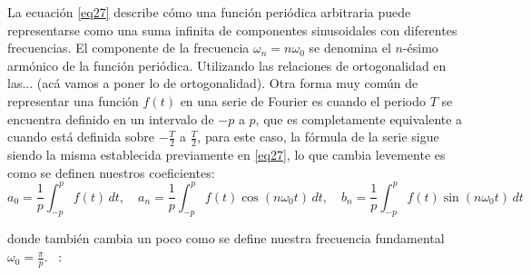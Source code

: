 La ecuación \eqref{eq27} describe cómo una función periódica arbitraria puede representarse como una suma infinita de componentes sinusoidales con diferentes frecuencias. El componente de la frecuencia $\omega_n = n\omega_0$ se denomina el $n$-ésimo armónico de la función periódica. Utilizando las relaciones de ortogonalidad en las... (acá vamos a poner lo de ortogonalidad).\newline
Otra forma muy común de representar una función $f(t)$ en una serie de Fourier es cuando el periodo $T$ se encuentra definido en un intervalo de $-p$ a $p$, que es completamente equivalente a cuando está definida sobre $-\frac{T}{2}$ a $\frac{T}{2}$, para este caso, la fórmula de la serie sigue siendo la misma establecida previamente en \eqref{eq27}, lo que cambia levemente es como se definen nuestros coeficientes: ~\cite{matesAvanzadasZill}
\begin{equation}\label{eq29}
	a_0 = \frac{1}{p} \int_{-p}^{p} f(t) \, dt, \quad a_n = \frac{1}{p} \int_{-p}^{p} f(t) \cos(n\omega_0 t) \, dt, \quad b_n = \frac{1}{p} \int_{-p}^{p} f(t) \sin(n\omega_0 t) \, dt
\end{equation}

donde también cambia un poco como se define nuestra frecuencia fundamental $\omega_0 = \frac{\pi}{p}$. ~\cite{matesAvanzadasZill}: 

